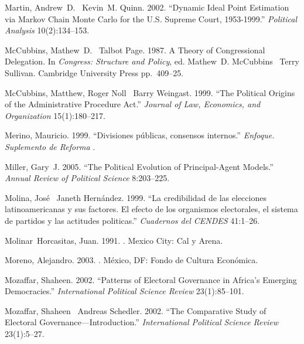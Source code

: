 \documentclass[12 pt, letter]{article}
\begin{document}
\begin{thebibliography}{77}
Martin, Andrew~D. \harvardand\ Kevin~M. Quinn. 2002.
\newblock ``Dynamic {I}deal {P}oint {E}stimation via {M}arkov {C}hain {M}onte
  {C}arlo for the {U}.{S}. {S}upreme {C}ourt, 1953-1999.'' {\em Political
  Analysis} 10(2):134--153.

McCubbins, Mathew~D. \harvardand\ Talbot Page. 1987.
\newblock A Theory of Congressional Delegation.  In {\em Congress: Structure
  and Policy}, ed. Mathew~D. McCubbins \harvardand\ Terry Sullivan.
\newblock Cambridge University Press pp.~409--25.

McCubbins, Matthew, Roger Noll \harvardand\ Barry Weingast. 1999.
\newblock ``The Political Origins of the Administrative Procedure Act.'' {\em
  Journal of Law, Economics, and Organization} 15(1):180--217.

Merino, Mauricio. 1999.
\newblock ``Divisiones p\'ublicas, consensos internos.'' {\em Enfoque.
  Suplemento de Reforma} .

Miller, Gary~J. 2005.
\newblock ``The Political Evolution of Principal-Agent Models.'' {\em Annual
  Review of Political Science} 8:203--225.

Molina, Jos\'{e} \harvardand\ Janeth Hern\'andez. 1999.
\newblock ``La credibilidad de las elecciones latinoamericanas y sus factores.
  {E}l efecto de los organismos electorales, el sistema de partidos y las
  actitudes politicas.'' {\em Cuadernos del CENDES} 41:1--26.

Molinar~Horcasitas, Juan. 1991.
.
\newblock Mexico City:  Cal y Arena.

Moreno, Alejandro. 2003.
.
\newblock M\'exico, DF:  Fondo de Cultura Econ\'omica.

Mozaffar, Shaheen. 2002.
\newblock ``Patterns of Electoral Governance in Africa's Emerging
  Democracies.'' {\em International Political Science Review} 23(1):85--101.

Mozaffar, Shaheen \harvardand\ Andreas Schedler. 2002.
\newblock ``The Comparative Study of Electoral Governance---Introduction.''
  {\em International Political Science Review} 23(1):5--27.


\end{thebibliography}
\end{document}
